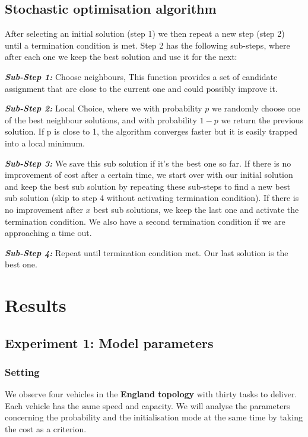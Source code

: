 \documentclass[11pt]{article}
\begin{document}
\subsection{Stochastic optimisation algorithm}
After selecting an initial solution (step 1) we then repeat a new step (step 2) until a termination condition is met. Step 2  has the following sub-steps, where after each one we keep the best solution and use it for the next:

\noindent \noindent \textbf{\textit{Sub-Step 1:}} Choose neighbours, This function provides a set of candidate assignment that are close to the current one and could possibly improve it.

\noindent \noindent \textbf{\textit{Sub-Step 2:}} Local Choice, where we with probability $p$ we randomly choose one of the best neighbour solutions, and with probability $1-p$ we return the previous solution. If p is close to 1, the algorithm converges faster but it is easily trapped into a local minimum.

\noindent \noindent \textbf{\textit{Sub-Step 3:}} We save this sub solution if it's the best one so far. If there is no improvement of cost after a certain time, we start over with our initial solution and keep the best sub solution by repeating these sub-steps to find a new best sub solution (skip to step 4 without activating termination condition). If there is no improvement after $x$ best sub solutions, we keep the last one and activate the termination condition. We also have a second termination condition if we are approaching a time out.

\noindent \noindent \textbf{\textit{Sub-Step 4:}} Repeat until termination condition met. Our last solution is the best one.


\section{Results}

\subsection{Experiment 1: Model parameters}

\subsubsection{Setting}
We observe four vehicles in the \textbf{England topology} with thirty tasks to deliver. Each vehicle has the same speed and capacity. We will analyse the parameters concerning the probability and the initialisation mode at the same time by taking the cost as a criterion.
\end{document}
